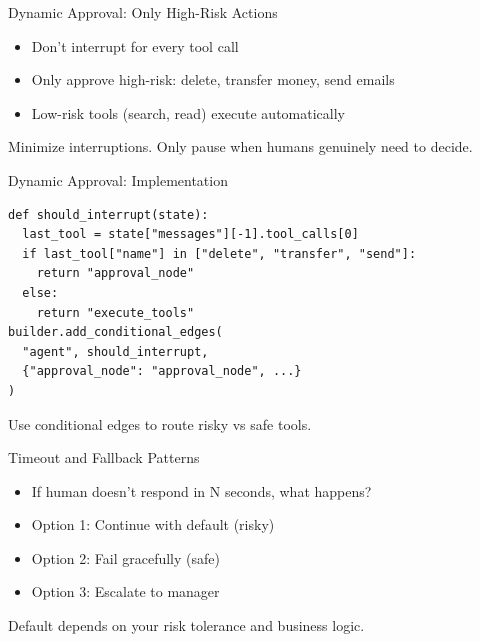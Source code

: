 \documentclass[aspectratio=169,11pt]{beamer}
\begin{document}
\begin{frame}{Dynamic Approval: Only High-Risk Actions}
  \begin{conceptbox}
    \setlength{\itemsep}{1pt}
    \begin{itemize}
      \item Don't interrupt for every tool call
      \item Only approve high-risk: delete, transfer money, send emails
      \item Low-risk tools (search, read) execute automatically
    \end{itemize}
  \end{conceptbox}
  \vspace{0.1cm}
  \begin{tipbox}
    Minimize interruptions. Only pause when humans genuinely need to decide.
  \end{tipbox}
\end{frame}

\begin{frame}[fragile]{Dynamic Approval: Implementation}
  \begin{codebox}
    \begin{lstlisting}
def should_interrupt(state):
  last_tool = state["messages"][-1].tool_calls[0]
  if last_tool["name"] in ["delete", "transfer", "send"]:
    return "approval_node"
  else:
    return "execute_tools"
builder.add_conditional_edges(
  "agent", should_interrupt,
  {"approval_node": "approval_node", ...}
)
    \end{lstlisting}
  \end{codebox}
  \vspace{0.1cm}
  \begin{tipbox}
    Use conditional edges to route risky vs safe tools.
  \end{tipbox}
\end{frame}

\begin{frame}{Timeout and Fallback Patterns}
  \begin{conceptbox}
    \setlength{\itemsep}{1pt}
    \begin{itemize}
      \item If human doesn't respond in N seconds, what happens?
      \item Option 1: Continue with default (risky)
      \item Option 2: Fail gracefully (safe)
      \item Option 3: Escalate to manager
    \end{itemize}
  \end{conceptbox}
  \vspace{0.1cm}
  \begin{tipbox}
    Default depends on your risk tolerance and business logic.
  \end{tipbox}
\end{frame}
\end{document}

